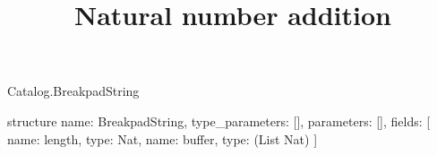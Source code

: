 \begin{lexlean}{Catalog.BreakpadString}
\title{Natural number addition}
\begin{semanticmodule}
structure{
  name: BreakpadString,
  type_parameters: [],
  parameters: [],
  fields: [
    {name: length, type: Nat},
    {name: buffer, type: (List Nat)}
  ]
}
\end{semanticmodule}
\end{lexlean}
